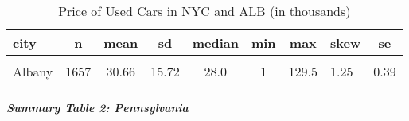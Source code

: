 \documentclass[
]{article}
\begin{document}
\begingroup\fontsize{16}{18}\selectfont

\begin{longtable}[t]{lcccccclc}
\caption{\label{tab:unnamed-chunk-10}Price of Used Cars in NYC and ALB (in thousands)}\\
\toprule
city & n & mean & sd & median & min & max & skew & se\\
\midrule
\cellcolor[HTML]{E0EEEE}{New York} & \cellcolor[HTML]{E0EEEE}{2587} & \cellcolor[HTML]{E0EEEE}{28.48} & \cellcolor[HTML]{E0EEEE}{16.79} & \cellcolor[HTML]{E0EEEE}{25.3} & \cellcolor[HTML]{E0EEEE}{1} & \cellcolor[HTML]{E0EEEE}{148.0} & \cellcolor[HTML]{E0EEEE}{1.38} & \cellcolor[HTML]{E0EEEE}{0.33}\\
Albany & 1657 & 30.66 & 15.72 & 28.0 & 1 & 129.5 & 1.25 & 0.39\\
\bottomrule
\end{longtable}
\endgroup{}

\hypertarget{summary-table-2-pennsylvania}{%
\subparagraph{Summary Table 2:
Pennsylvania}\label{summary-table-2-pennsylvania}}
\end{document}
